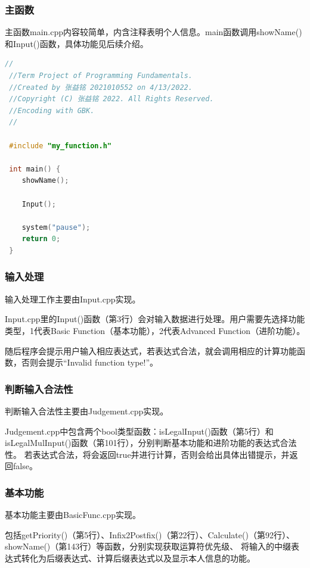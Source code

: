 \documentclass[a4paper, 11pt, UTF8]{ctexart}
\begin{document}
\subsubsection{主函数}

主函数main.cpp内容较简单，内含注释表明个人信息。main函数调用showName()和Input()函数，具体功能见后续介绍。

\begin{lstlisting}[language=C++, basicstyle=\ttfamily]
 //
 //Term Project of Programming Fundamentals.
 //Created by 张益铭 2021010552 on 4/13/2022.
 //Copyright (C) 张益铭 2022. All Rights Reserved.
 //Encoding with GBK.
 //

 #include "my_function.h"

 int main() {
    showName();
    
    Input();
    
    system("pause");
    return 0;
 }    
\end{lstlisting}

\subsubsection{输入处理}

输入处理工作主要由Input.cpp实现。

Input.cpp里的Input()函数（第3行）会对输入数据进行处理。用户需要先选择功能类型，1代表Basic Function（基本功能），2代表Advanced Function（进阶功能）。

随后程序会提示用户输入相应表达式，若表达式合法，就会调用相应的计算功能函数，否则会提示“Invalid function type!”。

\subsubsection{判断输入合法性}

判断输入合法性主要由Judgement.cpp实现。

Judgement.cpp中包含两个bool类型函数：isLegalInput()函数（第5行）和isLegalMulInput()函数（第101行），分别判断基本功能和进阶功能的表达式合法性。
若表达式合法，将会返回true并进行计算，否则会给出具体出错提示，并返回false。

\subsubsection{基本功能}

基本功能主要由BasicFunc.cpp实现。

包括getPriority()（第5行）、Infix2Postfix()（第22行）、Calculate()（第92行）、showName()（第143行）等函数，分别实现获取运算符优先级、
将输入的中缀表达式转化为后缀表达式、计算后缀表达式以及显示本人信息的功能。
\end{document}

